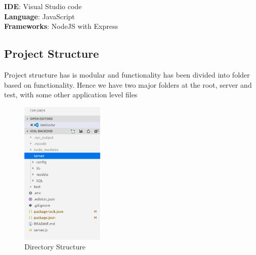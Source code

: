\textbf{IDE}: Visual Studio code\\
\textbf{Language}: JavaScript\\
\textbf{Frameworks}: NodeJS with Express



\subsection{Project Structure}
Project structure has is modular and functionality has been divided into folder based on functionality. Hence we have two major folders at the root, server and test, with some other application level files 


\begin{figure}[htp]
    \centering
    \includegraphics[width=4cm]{images/directystructure.png}
    \caption{Directory Structure}
    \label{fig:}
\end{figure}

